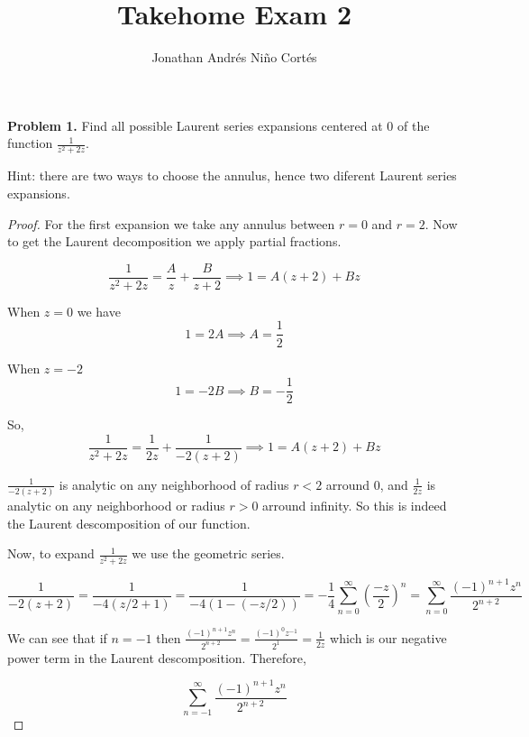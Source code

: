 \documentclass[letterpaper,twoside,11pt]{article}
\title{Takehome Exam 2}
\author{Jonathan Andr\'es Ni\~no Cort\'es}
\begin{document}
\maketitle
\textbf{Problem 1.} Find all possible Laurent series expansions centered at 0 of the function $\frac{1}{z^2+2z}$.

Hint: there are two ways to choose the annulus, hence two diferent Laurent series expansions.

\begin{proof}
For the first expansion we take any annulus between $r=0$ and $r=2$. Now to get the Laurent decomposition we apply partial fractions.

\begin{equation}
\frac{1}{z^2+2z}=\frac{A}{z}+\frac{B}{z+2} \implies 1=A(z+2)+Bz\nonumber
\end{equation}

When $z=0$ we have
\begin{equation}
1=2A  \implies A = \frac{1}{2} \nonumber
\end{equation}

When $z=-2$
\begin{equation}
1=-2B  \implies B = -\frac{1}{2} \nonumber
\end{equation}

So, 
\begin{equation}
\frac{1}{z^2+2z}=\frac{1}{2z}+\frac{1}{-2(z+2)} \implies 1=A(z+2)+Bz\nonumber
\end{equation}

$\frac{1}{-2(z+2)}$ is analytic on any neighborhood of radius $r<2$ arround 0, and $\frac{1}{2z}$ is analytic on any neighborhood or radius $r>0$ arround infinity. So this is indeed the Laurent descomposition of our function.

Now, to expand $\frac{1}{z^2+2z}$ we use the geometric series.

\begin{equation}
\frac{1}{-2(z+2)} = \frac{1}{-4(z/2+1)}=\frac{1}{-4(1-(-z/2))}= -\frac{1}{4}\sum_{n=0}^{\infty}(\frac{-z}{2})^n = \sum_{n=0}^{\infty}\frac{(-1)^{n+1}z^n}{2^{n+2}}\nonumber
\end{equation}

We can see that if $n=-1$ then $\frac{(-1)^{n+1}z^n}{2^{n+2}}=\frac{(-1)^{0}z^{-1}}{2^{1}}=\frac{1}{2z}$ which is our negative power term in the Laurent descomposition. Therefore,

\begin{equation}
\sum_{n=-1}^{\infty}\frac{(-1)^{n+1}z^n}{2^{n+2}} \nonumber
\end{equation}


\end{proof}
\end{document}
